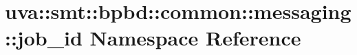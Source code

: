 \hypertarget{namespaceuva_1_1smt_1_1bpbd_1_1common_1_1messaging_1_1job__id}{}\section{uva\+:\+:smt\+:\+:bpbd\+:\+:common\+:\+:messaging\+:\+:job\+\_\+id Namespace Reference}
\label{namespaceuva_1_1smt_1_1bpbd_1_1common_1_1messaging_1_1job__id}
